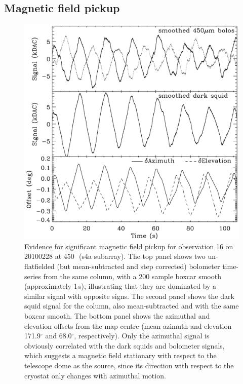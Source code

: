 \documentclass[useAMS,usenatbib,nofootinbib]{mn2e}
\begin{document}
\subsection{Magnetic field pickup}
\label{sec:magpickup}

\begin{figure}
\centering
\includegraphics[width=\linewidth]{magpickup}
\caption{Evidence for significant magnetic field pickup for
  observation 16 on 20100228 at 450\,\micron\ (s4a subarray).  The top
  panel shows two un-flatfielded (but mean-subtracted and step
  corrected) bolometer time-series from the same column, with a 200
  sample boxcar smooth (approximately 1\,s), illustrating that they
  are dominated by a similar signal with opposite signs. The second
  panel shows the dark squid signal for the column, also
  mean-subtracted and with the same boxcar smooth. The bottom panel
  shows the azimuthal and elevation offsets from the map centre (mean
  azimuth and elevation 171.9$^\circ$ and 68.0$^\circ$,
  respectively). Only the azimuthal signal is obviously correlated
  with the dark squids and bolometer signals, which suggests a
  magnetic field stationary with respect to the telescope dome as the
  source, since its direction with respect to the cryostat only
  changes with azimuthal motion.}
\label{fig:magpickup}
\end{figure}
\end{document}
